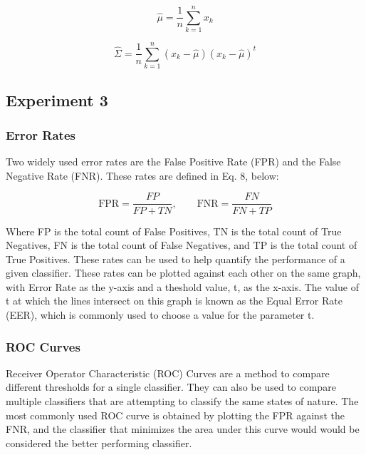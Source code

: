 \documentclass{article}
\begin{document}
\begin{equation}
\widehat{\mu} = \frac{1}{n}\sum_{k=1}^{n}x_{k}
\label{eq:1.6}
\end{equation}

\begin{equation}
\widehat{\Sigma} = \frac{1}{n}\sum_{k=1}^{n}(x_{k} - \widehat{\mu})(x_{k} - \widehat{\mu})^{t}
\label{eq:1.7}
\end{equation}

\subsection{Experiment 3}\label{experiment-3}
\subsubsection{Error Rates}\label{Error Rates}
Two widely used error rates are the False Positive Rate (FPR) and the False Negative Rate (FNR). These rates are defined in Eq. 8,
below:

\begin{equation}
\text{FPR} = \frac{FP}{FP + TN}, \qquad \text{FNR} = \frac{FN}{FN + TP}
\label{eq:1.8}
\end{equation}

Where FP is the total count of False Positives, TN is the total count of True Negatives, FN is the total count of False 
Negatives, and TP is the total count of True Positives. These rates can be used to help quantify the performance 
of a given classifier. These rates can be plotted against each other on the same graph, with Error Rate as the y-axis 
and a theshold value, t, as the x-axis. The value of t at which the lines intersect on this graph is known as the 
Equal Error Rate (EER), which is commonly used to choose a value for the parameter t. 

\subsubsection{ROC Curves}\label{ROC Curves}
Receiver Operator Characteristic (ROC) Curves are a method to compare different thresholds for a single classifier. They can also
be used to compare multiple classifiers that are attempting to classify the same states of nature. The most commonly used ROC curve is 
obtained by plotting the FPR against the FNR, and the classifier that minimizes the area under this curve would would be considered
the better performing classifier. 
\end{document}
